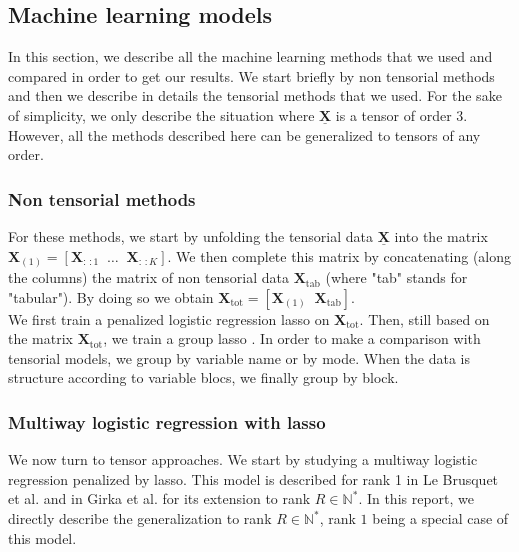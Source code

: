 \documentclass[preprint,12pt]{elsarticle}
\begin{document}
\subsection{Machine learning models}
\label{sec:models}

In this section, we describe all the machine learning methods that we used and compared in order to get our results. We start briefly by non tensorial methods and then we describe in details the tensorial methods that we used. For the sake of simplicity, we only describe the situation where $\underline{\mathbf{X}}$ is a tensor of order 3. However, all the methods described here can be generalized to tensors of any order.
\subsubsection{Non tensorial methods}
For these methods, we start by unfolding the tensorial data $\underline{\mathbf{X}}$ into the matrix $\mathbf{X}_{(1)} = [\mathbf{X}_{:\,:1}\; \; \ldots \; \;\mathbf{X}_{:\,:K}]$. We then complete this matrix  by concatenating (along the columns) the matrix of non tensorial data $\mathbf{X}_{\text{tab}}$ (where "tab" stands for "tabular"). By doing so we obtain $\mathbf{X}_{\text{tot}} = [\mathbf{X}_{(1)} \; \; \mathbf{X}_{\text{tab}}]$.\\
\indent We first train a penalized logistic regression lasso on $\mathbf{X}_{\text{tot}}$. Then, still based on the matrix $\mathbf{X}_{\text{tot}}$, we train a group lasso \cite{grp_lasso}. In order to make a comparison with tensorial models, we group by variable name or by mode. When the data is structure according to variable blocs, we finally group by block. 
\subsubsection{Multiway logistic regression with lasso}
\indent We now turn to tensor approaches. We start by studying a multiway logistic regression penalized by lasso. This model is described for rank 1 in Le Brusquet et al. \cite{multi_rank_1} and in Girka et al. \cite{multi_rank_r} for its extension to rank $R \in \mathbb{N}^{*}$. In this report, we directly describe the generalization to rank $R \in \mathbb{N}^{*}$, rank $1$ being a special case of this model.\\[5 pt]
\end{document}
